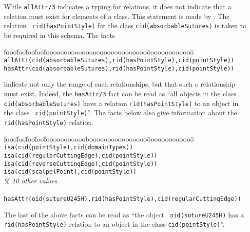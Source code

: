 \begin{example} \rm \label{ex:hasAttr}
While {\tt allAttr/3} indicates a typing for relations, it does not
indicate that a relation must exist for elements of a class.  This
statement is made by .  The relation {\tt
rid(hasPointStyle)} for the class {\tt cid(absorbableSutures)} is
taken to be required in this schema.  The facts
%
{\small
\begin{tabbing}
fooo\=foo\=foo\=foo\=foooooooooooooooooooooooooooo\=ooooooooooooo\=\kill
\> {\tt allAttr(cid(absorbableSutures),rid(hasPointStyle),cid(pointStyle)) } \\
\> {\tt hasAttr(cid(absorbableSutures),rid(hasPointStyle),cid(pointStyle)) }
\end{tabbing}
}
%
\noindent
indicate not only the range of such relationships, but that such a
relationship must exist.  Indeed, the {\tt hasAttr/3} fact can be read
as ``all objects in the class {\tt cid(absorbableSutures)} have a
relation {\tt rid(hasPointStyle)} to an object in the class {\tt
cid(pointStyle)}''.  The facts below also give information about the
{\tt rid(hasPointStyle)} relation.
%
{\small
\begin{tabbing}
fooo\=foo\=foo\=foo\=foooooooooooboooooooooooooooo\=ooooooooooooo\=\kill
\> {\tt isa(cid(pointStyle),cid(domainTypes))} \\
\> {\tt isa(cid(regularCuttingEdge),cid(pointStyle))} \\
\> {\tt isa(cid(reverseCuttingEdge),cid(pointStyle))} \\
\> {\tt isa(cid(scalpelPoint),cid(pointStyle))} \\
\> {\it \% 10 other values.} \\
\\
\> {\tt hasAttr(oid(sutureU245H),rid(hasPointStyle),cid(regularCuttingEdge))}
\end{tabbing}
} 
\noindent
The last of the above facts can be read as ``the object {\tt
oid(sutureU245H)} has a {\tt rid(hasPointStyle)} relation to an object
in the class {\tt cid(pointStyle)}''.  
\end{example}

